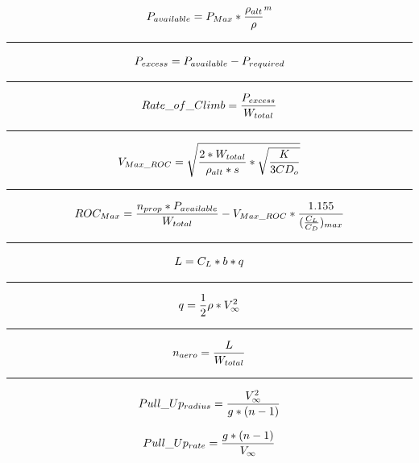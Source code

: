 \documentclass[12pt,A4paper]{article}
\begin{document}
\begin{multicols*}{2}
		\begin{equation}
			P_{available} = P_{Max} * {\frac{\rho_{alt}}{\rho}}^m \\
		\end{equation}
		\hrule
		\vspace{0.1 in}
		\begin{equation}
			P_{excess} = P_{available} - P_{required} \\
		\end{equation}
		\hrule
		\vspace{0.1 in}
		\begin{equation}
			Rate\_of\_Climb = \frac{P_{excess}}{W_{total}} \\
		\end{equation}
		\hrule
		\vspace{0.1 in}
		\begin{equation}
			V_{Max\_ROC} = \sqrt{{\frac{2*W_{total}}{\rho_{alt}*s}} * \sqrt{\frac{K}{3CD_o}}} \\
		\end{equation}
		\hrule
		\vspace{0.1 in}
		\begin{equation}
			ROC_{Max} = \frac{n_{prop}*P_{available}}{W_{total}} - V_{Max\_ROC} * \frac{1.155}{(\frac{C_L}{C_D})_{max}} \\
		\end{equation}
		\hrule
		\vspace{0.1 in}
		\begin{equation}
			L = C_L * b * q \\
		\end{equation}
		\hrule
		\vspace{0.1 in}
		\begin{equation}
			q = \frac{1}{2} \rho * V_\infty^2 \\
		\end{equation}
		\hrule
		\vspace{0.1 in}
		\begin{equation}
			n_{aero} = \frac{L}{W_{total}} \\
		\end{equation}
		\hrule
		\vspace{0.1 in}
		\begin{equation}
			Pull\_Up_{radius} = \frac{V_\infty^2}{g*(n-1)} \\
		\end{equation}
	\end{multicols*}
	\footnotesize
		\begin{equation}
			Pull\_Up_{rate} = \frac{g*(n-1)}{V_\infty} \\
		\end{equation}
\end{document}
